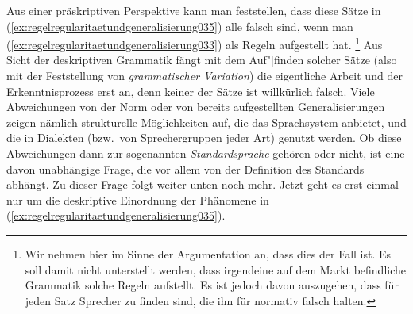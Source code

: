 Aus einer präskriptiven Perspektive kann man feststellen, dass diese Sätze in (\ref{ex:regelregularitaetundgeneralisierung035}) alle falsch sind, wenn man (\ref{ex:regelregularitaetundgeneralisierung033}) als Regeln aufgestellt hat.%
\footnote{Wir nehmen hier im Sinne der Argumentation an, dass dies der Fall ist.
Es soll damit nicht unterstellt werden, dass irgendeine auf dem Markt befindliche Grammatik solche Regeln aufstellt.
Es ist jedoch davon auszugehen, dass für jeden Satz Sprecher zu finden sind, die ihn für normativ falsch halten.}
Aus Sicht der deskriptiven Grammatik fängt mit dem Auf"|finden solcher Sätze (also mit der Feststellung von \textit{grammatischer Variation}) die eigentliche Arbeit und der Erkenntnisprozess erst an, denn keiner der Sätze ist willkürlich falsch.
Viele Abweichungen von der Norm oder von bereits aufgestellten Generalisierungen zeigen nämlich strukturelle Möglichkeiten auf, die das Sprachsystem anbietet, und die \zB in Dialekten (bzw.\ von Sprechergruppen jeder Art) genutzt werden.
Ob diese Abweichungen dann zur sogenannten \textit{Standardsprache} gehören oder nicht, ist eine davon unabhängige Frage, die vor allem von der Definition des Standards abhängt.
Zu dieser Frage folgt weiter unten noch mehr.
Jetzt geht es erst einmal nur um die deskriptive Einordnung der Phänomene in (\ref{ex:regelregularitaetundgeneralisierung035}).

